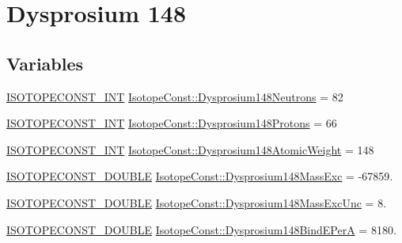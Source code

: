 \hypertarget{group___isotope_const-_dysprosium-_dy148}{}\section{Dysprosium 148}
\label{group___isotope_const-_dysprosium-_dy148}
\subsection*{Variables}
\begin{DoxyCompactItemize}
\item 
\mbox{\hyperlink{group___isotope_const-_macros_ga5f18360b3e99483a35c32d789e62621c}{I\+S\+O\+T\+O\+P\+E\+C\+O\+N\+S\+T\+\_\+\+I\+NT}} \mbox{\hyperlink{group___isotope_const-_dysprosium-_dy148_gafbf54113d3f076e979be3488b0cadd43}{Isotope\+Const\+::\+Dysprosium148\+Neutrons}} = 82
\item 
\mbox{\hyperlink{group___isotope_const-_macros_ga5f18360b3e99483a35c32d789e62621c}{I\+S\+O\+T\+O\+P\+E\+C\+O\+N\+S\+T\+\_\+\+I\+NT}} \mbox{\hyperlink{group___isotope_const-_dysprosium-_dy148_ga4c3e0da2d98907dcf61264d55fada4b3}{Isotope\+Const\+::\+Dysprosium148\+Protons}} = 66
\item 
\mbox{\hyperlink{group___isotope_const-_macros_ga5f18360b3e99483a35c32d789e62621c}{I\+S\+O\+T\+O\+P\+E\+C\+O\+N\+S\+T\+\_\+\+I\+NT}} \mbox{\hyperlink{group___isotope_const-_dysprosium-_dy148_gaf2283a429415f3f4bd0e4ffcc94b1f93}{Isotope\+Const\+::\+Dysprosium148\+Atomic\+Weight}} = 148
\item 
\mbox{\hyperlink{group___isotope_const-_macros_ga8f45a7272ce02c0b4c65c44636ed719a}{I\+S\+O\+T\+O\+P\+E\+C\+O\+N\+S\+T\+\_\+\+D\+O\+U\+B\+LE}} \mbox{\hyperlink{group___isotope_const-_dysprosium-_dy148_gaa3f8ec8c12ccd1b03621b75e172d604c}{Isotope\+Const\+::\+Dysprosium148\+Mass\+Exc}} = -\/67859.
\item 
\mbox{\hyperlink{group___isotope_const-_macros_ga8f45a7272ce02c0b4c65c44636ed719a}{I\+S\+O\+T\+O\+P\+E\+C\+O\+N\+S\+T\+\_\+\+D\+O\+U\+B\+LE}} \mbox{\hyperlink{group___isotope_const-_dysprosium-_dy148_gaede7719275d7289bdd662c2d49dc738f}{Isotope\+Const\+::\+Dysprosium148\+Mass\+Exc\+Unc}} = 8.
\item 
\mbox{\hyperlink{group___isotope_const-_macros_ga8f45a7272ce02c0b4c65c44636ed719a}{I\+S\+O\+T\+O\+P\+E\+C\+O\+N\+S\+T\+\_\+\+D\+O\+U\+B\+LE}} \mbox{\hyperlink{group___isotope_const-_dysprosium-_dy148_ga9fc3a4f9b033225d94c310cae42ea97b}{Isotope\+Const\+::\+Dysprosium148\+Bind\+E\+PerA}} = 8180.
\item 

\end{DoxyCompactItemize}
